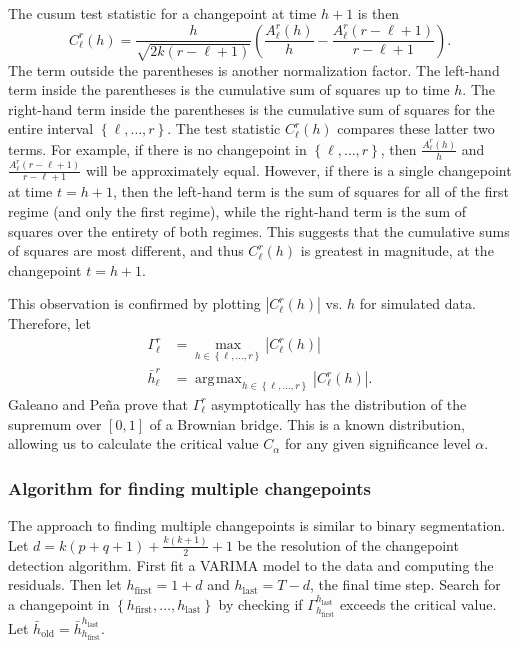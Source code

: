 \documentclass[conference,letterpaper]{IEEEtran}
\newcommand\prn[1]{\left( #1 \right)}
\newcommand\set[1]{\left\{ #1 \right\}}
\newcommand\abs[1]{\left| #1 \right|}
\newcommand\hfirst{{h_{\mathrm{first}}}}
\newcommand\hlast{{h_{\mathrm{last}}}}
\DeclareMathOperator*{\argmax}{\arg\!max}
\begin{document}
The cusum test statistic for a changepoint at time $h+1$ is then
$$C_\ell^r(h)=\frac{h}{\sqrt{2k(r-\ell+1)}}\prn{\frac{A_\ell^r(h)}{h}-\frac{A_\ell^r(r-\ell+1)}{r-\ell+1}}.$$
The term outside the parentheses is another normalization factor. The left-hand term inside the parentheses is the cumulative sum of squares up to time $h$. The right-hand term inside the parentheses is the cumulative sum of squares for the entire interval $\set{\ell,\ldots,r}$. The test statistic $C_\ell^r(h)$ compares these latter two terms. For example, if there is no changepoint in $\set{\ell,\ldots,r}$, then $\frac{A_\ell^r(h)}{h}$ and $\frac{A_\ell^r(r-\ell+1)}{r-\ell+1}$ will be approximately equal. However, if there is a single changepoint at time $t=h+1$, then the left-hand term is the sum of squares for all of the first regime (and only the first regime), while the right-hand term is the sum of squares over the entirety of both regimes. This suggests that the cumulative sums of squares are most different, and thus $C_\ell^r(h)$ is greatest in magnitude, at the changepoint $t=h+1$.

This observation is confirmed by plotting $\abs{C_\ell^r(h)}$ vs. $h$ for simulated data. Therefore, let
\begin{align*}
\Gamma_\ell^r&=\max_{h\in\set{\ell,\ldots,r}}|C_\ell^r(h)|\\
\bar h_\ell^r&=\argmax_{h\in\set{\ell,\ldots,r}}|C_\ell^r(h)|.
\end{align*}
Galeano and Pe\~{n}a prove that $\Gamma_\ell^r$ asymptotically has the distribution of the supremum over $[0,1]$ of a Brownian bridge. This is a known distribution, allowing us to calculate the critical value $C_\alpha$ for any given significance level $\alpha$.

\subsubsection{Algorithm for finding multiple changepoints}

The approach to finding multiple changepoints is similar to binary segmentation. Let $d=k(p+q+1)+\frac{k(k+1)}{2}+1$ be the resolution of the changepoint detection algorithm. First fit a VARIMA model to the data and computing the residuals. Then let $\hfirst=1+d$ and $\hlast=T-d$, the final time step. Search for a changepoint in $\set{\hfirst,\ldots,\hlast}$ by checking if $\Gamma_\hfirst^\hlast$ exceeds the critical value. Let $\bar h_{\mathrm{old}}=\bar h_\hfirst^\hlast$.
\end{document}
